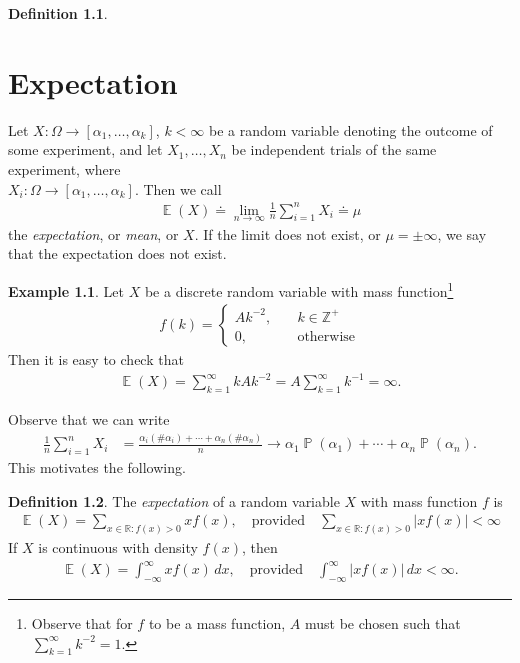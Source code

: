 \documentclass[12pt]{amsbook}
\newcommand{\rr}{\mathbb{R}}
\newcommand{\zz}{\mathbb{Z}}
\DeclareMathOperator{\ex}{\mathbb{E}}
\DeclareMathOperator{\prob}{\mathbb{P}}
\theoremstyle{plain}
\theoremstyle{definition}
\newtheorem*{definition}{Definition}
\newtheorem*{example}{Example}
\theoremstyle{remark}
\numberwithin{equation}{section}  %
\numberwithin{equation}{section}  %
\begin{document}
\begin{definition}
	\chapter{Expectation}
	Let $X: \Omega \to [\alpha_1, \ldots, \alpha_k]$, $k < \infty$ be a random
	variable denoting the outcome of some experiment, and let $X_1, \ldots, 
	X_n$ be independent trials
	of the same experiment, where \\ $X_i:
	\Omega \to [\alpha_1, \ldots, \alpha_k]$. Then we 
	call
	\begin{align*}
		\ex(X) \doteq \lim_{n \to \infty} \frac{1}{n} \sum_{i =1}^n X_i \doteq 
		\mu 
	\end{align*}
	the \emph{expectation}, or \emph{mean}, or $X$. If the limit does not exist,
	or $\mu = \pm \infty$, we say that the expectation does not exist.
\end{definition}
\begin{example}
	Let $X$ be a discrete random variable with mass function\footnote{
		Observe that for $f$ to be a mass function, $A$ must be chosen such that
		$\sum_{k = 1}^{\infty} k^{-2} = 1$.}
		\begin{align*}
			f(k) = \begin{cases}
				A k^{-2},  \quad &k\in \zz^{+} 
				\\
				0, \quad & \text{otherwise}
			\end{cases}
		\end{align*}
		Then it is easy to check that
		\begin{align*}
			\ex(X) = \sum_{k=1}^{\infty} k A k^{-2} = A \sum_{k=1}^{\infty} k^{-1} = 
			\infty.
		\end{align*}
	\end{example}
	Observe that we can write
	\begin{align*}
		\frac{1}{n} \sum_{i = 1}^n X_i
		& = \frac{\alpha_i (\#\alpha_i) + \cdots +
		\alpha_n (\#\alpha_n)}{n}
		\to \alpha_1 \prob(\alpha_1) + \cdots + \alpha_n \prob(\alpha_n).
	\end{align*}
	This motivates the following.
	\begin{definition}
		The \emph{expectation} of a random variable $X$ with mass function $f$ is
		\begin{align*}
			\ex(X) = \sum_{x \in \rr: f(x) > 0} x f(x), \quad \text{provided} \quad
			\sum_{x \in \rr: f(x) > 0} |x
			f(x) | <
			\infty
		\end{align*}
		If $X$ is continuous with density $f(x)$, then
		\begin{align*}
			\ex(X) = \int_{-\infty}^{\infty} x f(x) \, dx, \quad \text{provided} \quad
			\int_{-\infty}^{\infty} |x f(x)| \, dx < \infty.
		\end{align*}
	\end{definition}
\end{document}
